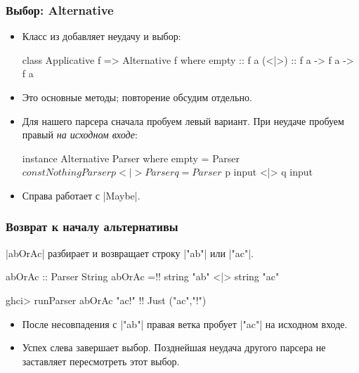 \documentclass[11pt]{beamer}
\begin{document}
\begin{frame}[fragile]
  \frametitle{Выбор: Alternative}
  \begin{itemize}
    \item Класс из \href{https://hackage.haskell.org/package/base/docs/Control-Applicative.html}{} добавляет неудачу и выбор:
      \begin{haskellsmall}
        class Applicative f => Alternative f where
          empty :: f a
          (<|>) :: f a -> f a -> f a
      \end{haskellsmall}
    \item Это основные методы; повторение обсудим отдельно.
      \pause
    \item Для нашего парсера сначала пробуем левый вариант. При неудаче пробуем правый \emph{на исходном входе}:
      \begin{haskellsmall}
        instance Alternative Parser where
          empty = Parser $ const Nothing
          Parser p <|> Parser q = Parser $ 
            p input <|> q input
      \end{haskellsmall}
    \item Справа \haskinline{(<|>)} работает с \haskinline|Maybe|.
  \end{itemize}
\end{frame}

\begin{frame}[fragile]
  \frametitle{Возврат к началу альтернативы}
  \haskinline|abOrAc| разбирает и возвращает строку \haskinline|"ab"| или \haskinline|"ac"|.
  \pause
  \begin{haskellsmall}
    abOrAc :: Parser String
    abOrAc =!\pause! string "ab" <|> string "ac"
  \end{haskellsmall}
  \begin{haskellsmall}
    ghci> runParser abOrAc "ac!" !\pause!
    Just ("ac","!")
  \end{haskellsmall}
  \begin{itemize}
    \item После несовпадения с \haskinline|"ab"| правая ветка пробует \haskinline|"ac"| на исходном входе.
      \pause
    \item Успех слева завершает выбор. Позднейшая неудача другого парсера не заставляет пересмотреть этот выбор.
  \end{itemize}
\end{frame}
\end{document}
